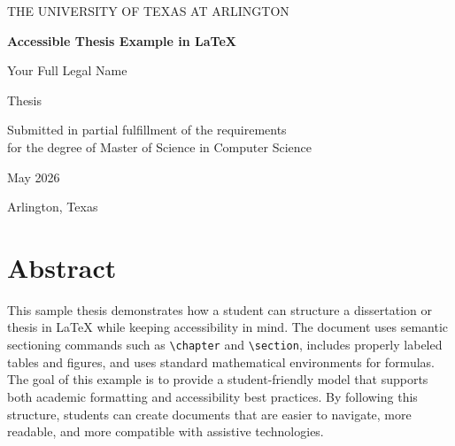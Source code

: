 \documentclass[12pt]{report}
\begin{document}
 
 
\begin{titlepage} 
    \centering 
    {\Large THE UNIVERSITY OF TEXAS AT ARLINGTON\par} 
    \vspace{1.5cm} 
     
    {\Huge\bfseries Accessible Thesis Example in LaTeX\par} 
    \vspace{1.5cm} 
     
    {\Large Your Full Legal Name\par} 
    \vspace{1.5cm} 
     
    {\large Thesis\par} 
    \vspace{1cm} 
     
    {\large Submitted in partial fulfillment of the requirements\\ 
    for the degree of Master of Science in Computer Science\par} 
    \vspace{1.5cm} 
     
    {\large May 2026\par} 
    \vspace{1cm} 
     
    {\large Arlington, Texas\par} 
\end{titlepage} 
 
 
\chapter*{Abstract} 
 
This sample thesis demonstrates how a student can structure a dissertation or thesis in LaTeX while keeping accessibility in mind. The document uses semantic sectioning commands such as \verb|\chapter| and \verb|\section|, includes properly labeled tables and figures, and uses standard mathematical environments for formulas. The goal of this example is to provide a student-friendly model that supports both academic formatting and accessibility best practices. By following this structure, students can create documents that are easier to navigate, more readable, and more compatible with assistive technologies. 
 
\end{document}
